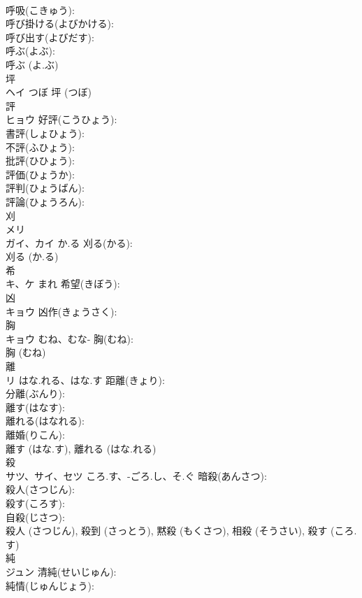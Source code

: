 \documentclass[8pt]{extreport}
\begin{document}
\begin{CJK}{UTF8}{min}
\\	呼吸(こきゅう): 
\\	呼び掛ける(よびかける): 
\\	呼び出す(よびだす): 
\\	呼ぶ(よぶ): 
\\	呼ぶ (よ.ぶ)
\\	坪			
\\	ヘイ	つぼ		坪 (つぼ)
\\	評			
\\	ヒョウ		好評(こうひょう): 
\\	書評(しょひょう): 
\\	不評(ふひょう): 
\\	批評(ひひょう): 
\\	評価(ひょうか): 
\\	評判(ひょうばん): 
\\	評論(ひょうろん): 
\\	刈			
\\	メリ
\\	ガイ、カイ	か.る	刈る(かる): 
\\	刈る (か.る)
\\	希			
\\	キ、ケ	まれ	希望(きぼう): 
\\	凶			
\\	キョウ		凶作(きょうさく): 
\\	胸			
\\	キョウ	むね、むな-	胸(むね): 
\\	胸 (むね)
\\	離			
\\	リ	はな.れる、はな.す	距離(きょり): 
\\	分離(ぶんり): 
\\	離す(はなす): 
\\	離れる(はなれる): 
\\	離婚(りこん): 
\\	離す (はな.す), 離れる (はな.れる)
\\	殺			
\\	サツ、サイ、セツ	ころ.す、-ごろ.し、そ.ぐ	暗殺(あんさつ): 
\\	殺人(さつじん): 
\\	殺す(ころす): 
\\	自殺(じさつ): 
\\	殺人 (さつじん), 殺到 (さっとう), 黙殺 (もくさつ), 相殺 (そうさい), 殺す (ころ.す)
\\	純			
\\	ジュン		清純(せいじゅん): 
\\	純情(じゅんじょう): 

\end{CJK}
\end{document}
